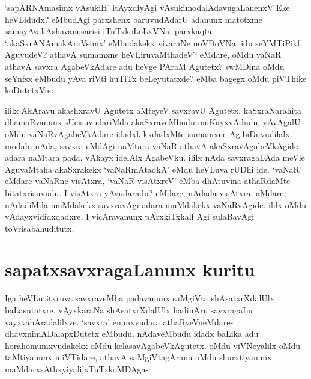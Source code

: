 `sapARNAmasimx vAsukiH'\label{95a} itAyxdiyAgi vAsukimodalAdavugaLanenxV Eke heVLidudx? eMbudAgi parxshenx baruvudAdarU adanunx matotxme samayAvakAshavanusarisi iTuTxkoLoLxVNa. parxkaqta `akaSxrANAmakAroV\s simx' eMbudakekx vivaraNe noVDoVNa. idu seYMTiPikf AguvudeV? athavA sumamxne heVLiruvaMthadeV? eMdare, oMdu vaNaR athavA savxra AgabeVkAdare adu heVge PAraM Agutetx? swMDina oMdu seYnfsx eMbudu yAva riVti huTiTx beLeyutatxde? eMba bagegx oMdu piVThike koDutetxVne-

ililx AkAravu akashxravU Agutetx aMteyeV savxravU Agutetx. kaSxraNarahita dhamaRvanunx sUcisuvudariMda akaSxraveMbudu muKayxvAdudu. yAvAgalU oMdu vaNaRvAgabeVkAdare idadxkikxdadxMte sumamxne AgibiDuvudilalx. modalu nAda, savxra eMdAgi naMtara vaNaR athavA akaSxravAgabeVkAgide. adara naMtara pada, vAkayx idelAlx AgabeVku. ililx nAda savxragaLAda meVle AguvaMtaha akaSxrakekx `vaNaRmAtaqkA' eMdu heVLuva rUDhi ide. `vaNaR' eMdare vaNaRne-visAtxra, `vaNaR-visAtxreV' eMba dhAtuvina athaRdaMte bitatxrisuvudu. I visAtxra yAvudaradu? eMdare, nAdada visAtxra. aMdare, nAdadiMda muMdakekx savxravAgi adara muMdakekx vaNaRvAgide. ililx oMdu vAdayxvididxdadxre, I vicAravanunx pArxkiTxkalf Agi sulaBavAgi toVrisabahuditutx.

\section*{sapatxsavxragaLanunx kuritu}

Iga heVLutitxruva savxraveMba padavanunx saMgiVta shAsatxrXdalUlx baLasutatxre. vAyxkaraNa shAsatxrXdalUlx hadinAru savxragaLu vayxvahAradalilxve. `savxra' enunxvudara athaRveVneMdare-dhavxnimADalapxDutetx eMbudu. nAdaveMbudu idadx baLika adu horahomumxvudakekx oMdu kelasavAgabeVkAgutetx. oMdu viVNeyalilx oMdu taMtiyanunx miVTidare, athavA saMgiVtagAranu oMdu shurxtiyanunx maMdarxsAthxyiyalilxTuTxkoMDAga-

